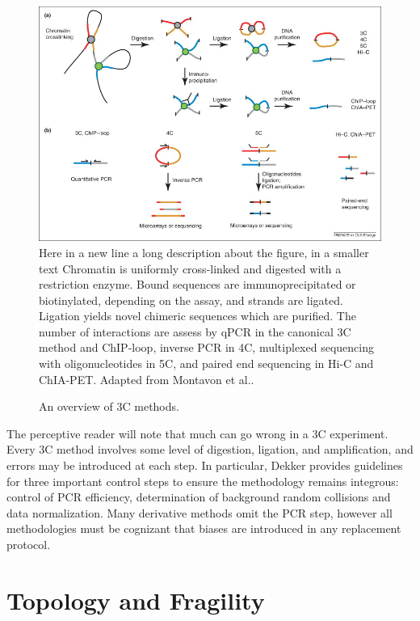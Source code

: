 \begin{figure}[h]
  \centering
  \caption{An overview of \gls{3C} methods.}\label{fig:captureTechniques}
  \includegraphics[width=\textwidth]{figures/biology/CompareChromosomeCapture}
  \medskip
  \small
  Here in a new line a long description about the figure, in a smaller text
  Chromatin is uniformly cross-linked and digested with a restriction enzyme.
  Bound sequences are immunoprecipitated or biotinylated, depending on the
  assay, and strands are ligated.  Ligation yields novel chimeric sequences
  which are purified.  The number of interactions are assess by qPCR in
  the canonical \gls{3C} method and ChIP-loop, inverse PCR in 4C, multiplexed
  sequencing with oligonucleotides in 5C, and paired end sequencing in Hi-C
  and ChIA-PET\@.  Adapted from Montavon et al.\cite{montavon2012}.
\end{figure}


The perceptive reader will note that much can go wrong in a \gls{3C} experiment. Every \gls{3C} method involves some level of digestion, ligation,
and amplification, and errors may be introduced at each step.  In particular, Dekker provides guidelines for three important control steps to
ensure the methodology remains integrous: control of PCR efficiency, determination of background random collisions and data
normalization\cite{dekker2006}.  Many derivative methods omit the PCR step, however all methodologies must be cognizant that
biases are introduced in any replacement protocol.

\section*{Topology and Fragility}

